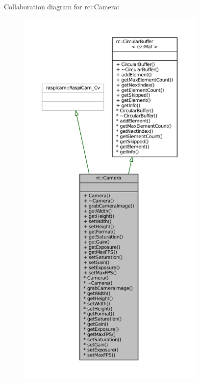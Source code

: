 Collaboration diagram for rc\+:\+:Camera\+:\nopagebreak
\begin{figure}[H]
\begin{center}
\leavevmode
\includegraphics[height=550pt]{classrc_1_1Camera__coll__graph}
\end{center}
\end{figure}
